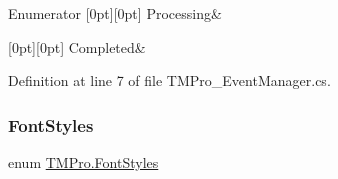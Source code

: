 \begin{DoxyEnumFields}{Enumerator}
[0pt][0pt]{}\mbox{\label{namespace_t_m_pro_af6aadc6d9f8a76a743cd456760e57316a643562a9ae7099c8aabfdc93478db117}} 
Processing&\\
\hline

[0pt][0pt]{}\mbox{\label{namespace_t_m_pro_af6aadc6d9f8a76a743cd456760e57316a07ca5050e697392c9ed47e6453f1453f}} 
Completed&\\
\hline

\end{DoxyEnumFields}


Definition at line 7 of file T\+M\+Pro\+\_\+\+Event\+Manager.\+cs.

\mbox{\label{namespace_t_m_pro_aedf79b6e7e2ce2b9c9ac84e790596e7c}} 
\subsubsection{\texorpdfstring{FontStyles}{FontStyles}}
{\footnotesize\ttfamily enum \mbox{\hyperlink{namespace_t_m_pro_aedf79b6e7e2ce2b9c9ac84e790596e7c}{T\+M\+Pro.\+Font\+Styles}}\hspace{0.3cm}{\ttfamily [strong]}}

